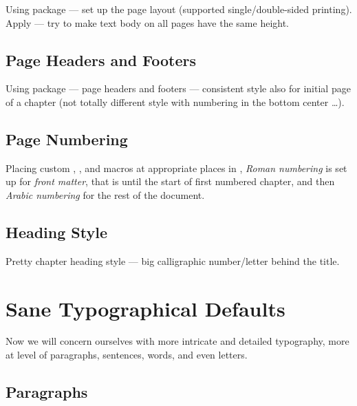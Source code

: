 Using  package --- set up the page layout (supported single/double-sided printing).
Apply \macro{\flushbottom} --- try to make text body on all pages have the same height.

\subsection{Page Headers and Footers}%
\label{sub:Headers Footers}

Using  package --- page headers and footers --- consistent style also for initial page of a chapter (not totally different style with numbering in the bottom center \ldots).

\subsection{Page Numbering}%
\label{sub:Page Numbering}

Placing custom \custommacro{\frontmatter}, \custommacro{\mainmatter}, and \custommacro{\backmatter} macros at appropriate places in , \emph{Roman numbering} is set up for \emph{front matter}, that is until the start of first numbered chapter, and then \emph{Arabic numbering} for the rest of the document.


\subsection{Heading Style}%
\label{sub:Heading Style}

Pretty chapter heading style --- big calligraphic number/letter behind the title.


\section{Sane Typographical Defaults}%
\label{sec:Sane Typographical Defaults}

Now we will concern ourselves with more intricate and detailed typography, more at level of paragraphs, sentences, words, and even letters.

\subsection{Paragraphs}%
\label{sub:Paragraphs}

